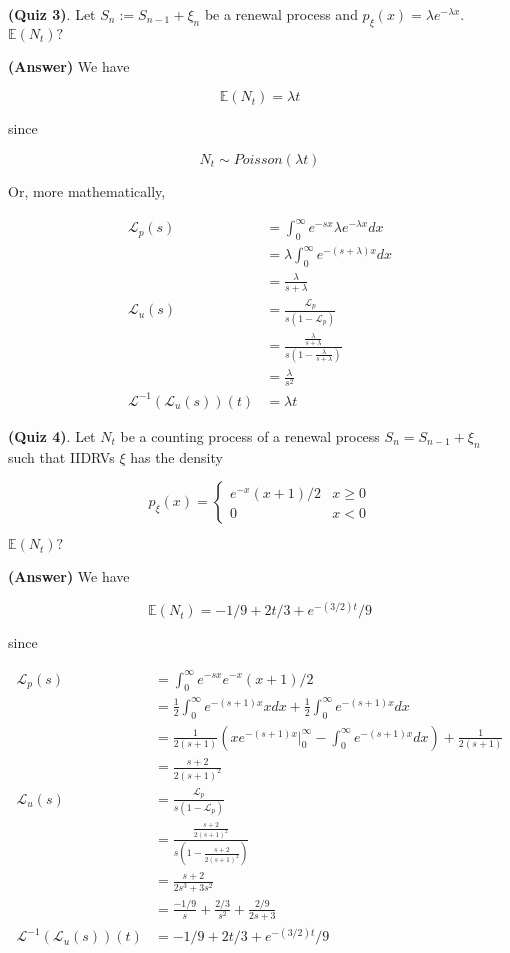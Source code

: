 \documentclass[12pt]{article}
\theoremstyle{nonumberbreak}
\begin{document}
\textbf{(Quiz 3)}. Let $S_n := S_{n-1} + \xi_n$ be a renewal process and $p_\xi (x) = \lambda e^{-\lambda x}$. $\mathbb{E}(N_t)?$

\textbf{(Answer)} We have

$$
\mathbb{E}(N_t) = \lambda t
$$

since

$$
N_t \sim Poisson(\lambda t)
$$

Or, more mathematically, 

$$
\begin{aligned}
\mathcal{L}_p (s) &= \int_0^\infty e^{-sx} \lambda e^{-\lambda x} dx \\[8pt]
&= \lambda \int_0^\infty e^{-(s+\lambda)x} dx \\[8pt]
&= \frac{\lambda}{s + \lambda} \\[10pt]
\mathcal{L}_u (s) &= \frac{\mathcal{L}_p}{s(1-\mathcal{L}_p)} \\[8pt]
&= \frac{\frac{\lambda}{s + \lambda}}{s(1-\frac{\lambda}{s + \lambda})} \\[8pt]
&= \frac{\lambda}{s^2} \\[10pt]
\mathcal{L}^{-1}(\mathcal{L}_u (s))(t) &= \lambda t
\end{aligned}
$$


\textbf{(Quiz 4)}. Let $N_t$ be a counting process of a renewal process $S_n = S_{n-1} + \xi_n$ such that IIDRVs $\xi$ has the density

$$
p_\xi (x) = \begin{cases}
e^{-x} (x+1)/2 & x \ge 0 \\
0 & x <0
\end{cases}
$$

$\mathbb{E}(N_t)?$

\textbf{(Answer)} We have

$$
\mathbb{E}(N_t) = -1/9 + 2t/3 + e^{-(3/2)t}/9
$$

since 

$$
\begin{aligned}
\mathcal{L}_p (s) &= \int_0^\infty e^{-sx} e^{-x}(x+1)/2 \\[8pt]
&= \frac{1}{2} \int_0^\infty e^{-(s+1)x} x dx + \frac{1}{2} \int_0^\infty e^{-(s+1)x}dx  \\[8pt]
&= \frac{1}{2(s+1)} (xe^{-(s+1)x} \vert_0^\infty - \int_0^\infty e^{-(s+1)x} dx ) + \frac{1}{2(s+1)} \\[8pt]
&= \frac{s+2}{2(s+1)^2}\\[10pt]
\mathcal{L}_u (s) &= \frac{\mathcal{L}_p}{s(1-\mathcal{L}_p)} \\[8pt]
&= \frac{\frac{s+2}{2(s+1)^2}}{s(1-\frac{s+2}{2(s+1)^2})} \\[8pt]
&= \frac{s+2}{2s^3 + 3s^2} \\[8pt]
&= \frac{-1/9}{s} + \frac{2/3}{s^2} + \frac{2/9}{2s+3} \\[10pt]
\mathcal{L}^{-1}(\mathcal{L}_u (s))(t) &= -1/9 + 2t/3 + e^{-(3/2)t}/9
\end{aligned}
$$
\end{document}
